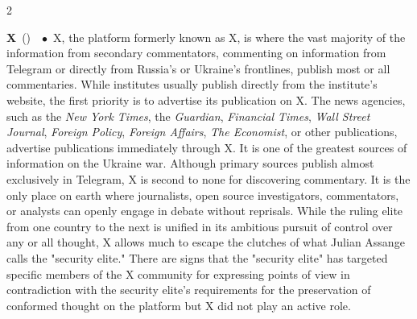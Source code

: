 \documentclass[10pt,a4paper,twoside]{article} %
\newcommand{\entry}[4]{\markboth{#1}{#1}\textbf{#1}\ {(#2)}\ \textit{#3}\ $\bullet$\ {#4}}  %
\begin{document}
\begin{multicols}{2}

\entry {X} {} {} {X, the platform formerly known as X, is where the vast majority of the information from secondary commentators, commenting on information from Telegram or directly from Russia's or Ukraine's frontlines, publish most or all commentaries. While institutes usually publish directly from the institute's website, the first priority is to advertise its publication on X. The news agencies, such as the \emph{New York Times}, the \emph{Guardian}, \emph{Financial Times}, \emph{Wall Street Journal}, \emph{Foreign Policy}, \emph{Foreign Affairs}, \emph{The Economist}, or other publications, advertise publications immediately through X. It is one of the greatest sources of information on the Ukraine war. Although primary sources publish almost exclusively in Telegram, X is second to none for discovering commentary. \newline \indent It is the only place on earth where journalists, open source investigators, commentators, or analysts can openly engage in debate without reprisals. While the ruling elite from one country to the next is unified in its ambitious pursuit of control over any or all thought, X allows much to escape the clutches of what Julian Assange calls the "security elite." \newline \indent There are signs that the "security elite" has targeted specific members of the X community for expressing points of view in contradiction with the security elite's requirements for the preservation of conformed thought on the platform but X did not play an active role.
}


\end{multicols}
\end{document}
